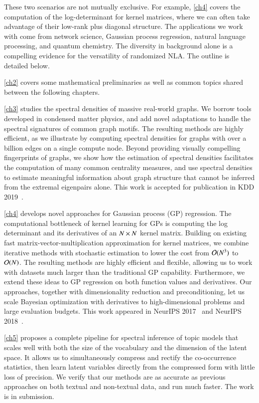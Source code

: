 These two scenarios are not mutually exclusive. For example, \cref{ch4} covers
the computation of the log\hyp{}determinant for kernel matrices, where we can
often take advantage of their low\hyp{}rank plus diagonal structure. The
applications we work with come from network science, Gaussian process
regression, natural language processing, and quantum chemistry. The diversity in
background alone is a compelling evidence for the versatility of randomized NLA.
The outline is detailed below.

\cref{ch2} covers some mathematical preliminaries as well as common topics
shared between the following chapters.

\cref{ch3} studies the spectral densities of massive real\hyp{}world graphs. We
borrow tools developed in condensed matter physics, and add novel adaptations to
handle the spectral signatures of common graph motifs.  The resulting methods
are highly efficient, as we illustrate by computing spectral densities for
graphs with over a billion edges on a single compute node. Beyond providing
visually compelling fingerprints of graphs, we show how the estimation of
spectral densities facilitates the computation of many common centrality
measures, and use spectral densities to estimate meaningful information about
graph structure that cannot be inferred from the extremal eigenpairs alone. This
work is accepted for publication in KDD 2019~\cite{dong2019network}.

\cref{ch4} develops novel approaches for Gaussian process (GP) regression.
The computational bottleneck of kernel learning for GPs is computing the log
determinant and its derivatives of an $N\mathbin{\times} N$ kernel matrix. Building on
existing fast matrix-vector-multiplication approximation for kernel
matrices, we combine iterative methods with stochastic estimation to
lower the cost from $\mathcal{O}(N^3)$ to $\mathcal{O}(N)$. The resulting methods are highly
efficient and flexible, allowing us to work with datasets much larger than
the traditional GP capability. Furthermore, we extend these ideas to GP
regression on both function values and derivatives. Our approaches, together
with dimensionality reduction and preconditioning, let us scale Bayesian
optimization with derivatives to high\hyp{}dimensional problems and large
evaluation budgets. This work appeared in NeurIPS 2017~\cite{dong2017scalable}
and NeurIPS 2018~\cite{eriksson2018scaling}.

\cref{ch5} proposes a complete pipeline for spectral inference of topic
models that scales well with both the size of the vocabulary and the
dimension of the latent space. It allows us to simultaneously compress and
rectify the co\hyp{}occurrence statistics, then learn latent variables directly
from the compressed form with little loss of precision. We verify that our
methods are as accurate as previous approaches on both textual and
non\hyp{}textual data, and run much faster. The work is in submission.

